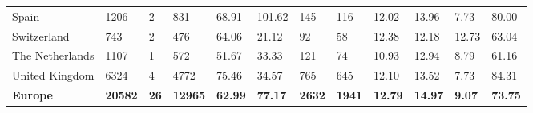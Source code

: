\begin{tabular}{llllllllllll}
  Spain & 1206 & 2 & 831 & 68.91 & 101.62 & 145 & 116 & 12.02 & 13.96 & 7.73 & 80.00 \\ 
  Switzerland & 743 & 2 & 476 & 64.06 & 21.12 & 92 & 58 & 12.38 & 12.18 & 12.73 & 63.04 \\ 
  The Netherlands & 1107 & 1 & 572 & 51.67 & 33.33 & 121 & 74 & 10.93 & 12.94 & 8.79 & 61.16 \\ 
  United Kingdom & 6324 & 4 & 4772 & 75.46 & 34.57 & 765 & 645 & 12.10 & 13.52 & 7.73 & 84.31 \\ 
  \textbf{Europe} & \textbf{20582} & \textbf{26} & \textbf{12965} & \textbf{62.99} & \textbf{77.17} & \textbf{2632} & \textbf{1941} & \textbf{12.79} & \textbf{14.97} & \textbf{9.07} & \textbf{73.75} \\ 
   \bottomrule
\end{tabular}
